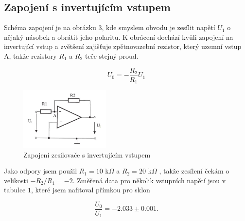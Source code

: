 \documentclass[a4paper,11pt]{article}
\begin{document}
\subsection{Zapojení s invertujícím vstupem}

Schéma zapojení je na obrázku 3, kde smyslem obvodu je zesílit napětí $ U_1 $ o nějaký násobek a obrátit jeho polaritu. K obrácení dochází kvůli zapojení na invertující vstup a zvětšení zajišťuje zpětnovazební rezistor, který uzemní vstup A, takže rezistory $ R_1 $ a $ R_2 $ teče stejný proud.

\begin{equation}
U_{0} = - \frac{R_2}{R_1} U_1
\end{equation}

\begin{figure}[htpb]
    \centering
    \includegraphics[width=0.4\textwidth]{invertujici_sch.jpg}
    \caption{Zapojení zesilovače s invertujícím vstupem}
\end{figure}

Jako odpory jsem použil $ R_1 = 10 \text{ k} \Omega $ a $ R_2 = 20 \text{ k} \Omega  $ , takže zesílení čekám o velikosti $ - R_2 / R_1 = -2 $. Změřená data pro několik vstupních napětí jsou v tabulce $ 1 $, které jsem nafitoval přímkou pro sklon 

\begin{equation}
\frac{U_0}{U_1} = -2.033 \pm 0.001.
\end{equation}
\end{document}

